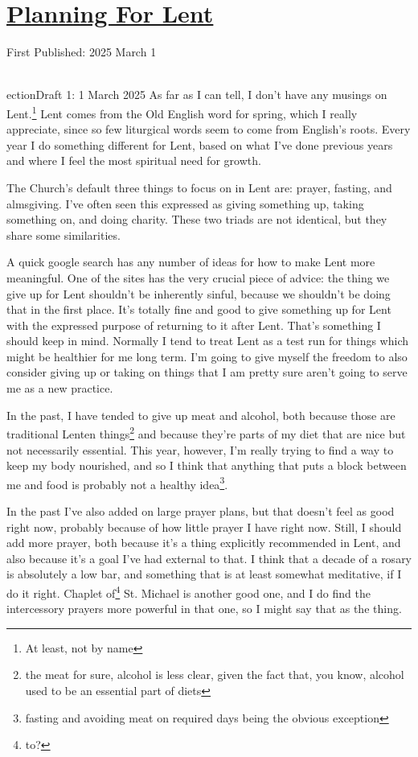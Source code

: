 \documentclass[12pt]{article}[titlepage]
\renewcommand{\,}{\textsuperscript{,}}
\begin{document}
\doublespacing
\section{\href{planning-lent-2025.html}{Planning For Lent}}
First Published: 2025 March 1

\\ection{Draft 1: 1 March 2025}  
As far as I can tell, I don't have any musings on Lent.\footnote{At least, not by name}  
Lent comes from the Old English word for spring, which I really appreciate, since so few liturgical words seem to come from English's roots.  
Every year I do something different for Lent, based on what I've done previous years and where I feel the most spiritual need for growth.  


The Church's default three things to focus on in Lent are: prayer, fasting, and almsgiving.  
I've often seen this expressed as giving something up, taking something on, and doing charity.  
These two triads are not identical, but they share some similarities.

A quick google search has any number of ideas for how to make Lent more meaningful.  
One of the sites has the very crucial piece of advice: the thing we give up for Lent shouldn't be inherently sinful, because we shouldn't be doing that in the first place.  
It's totally fine and good to give something up for Lent with the expressed purpose of returning to it after Lent.  
That's something I should keep in mind.  
Normally I tend to treat Lent as a test run for things which might be healthier for me long term.  
I'm going to give myself the freedom to also consider giving up or taking on things that I am pretty sure aren't going to serve me as a new practice.

In the past, I have tended to give up meat and alcohol, both because those are traditional Lenten things\footnote{the meat for sure, alcohol is less clear, given the fact that, you know, alcohol used to be an essential part of diets} and because they're parts of my diet that are nice but not necessarily essential.  
This year, however, I'm really trying to find a way to keep my body nourished, and so I think that anything that puts a block between me and food is probably not a healthy idea\footnote{fasting and avoiding meat on required days being the obvious exception}.

In the past I've also added on large prayer plans, but that doesn't feel as good right now, probably because of how little prayer I have right now.  
Still, I should add more prayer, both because it's a thing explicitly recommended in Lent, and also because it's a goal I've had external to that.  
I think that a decade of a rosary is absolutely a low bar, and something that is at least somewhat meditative, if I do it right.  
Chaplet of\footnote{to?} St. Michael is another good one, and I do find the intercessory prayers more powerful in that one, so I might say that as the thing.
\end{document}
